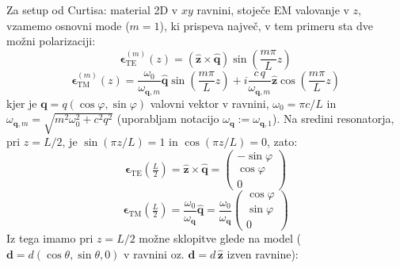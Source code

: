 \documentclass[a4paper,10pt]{article}
\renewcommand{\vec}[1]{\mathbf{#1}}
\begin{document}
Za setup od Curtisa: material 2D v $xy$ ravnini, stoječe EM valovanje v $z$, vzamemo osnovni mode ($m=1$), ki prispeva največ, v tem primeru sta dve možni polarizaciji:
\begin{equation}
\vec{\bm{\epsilon}}_{\text{TE}}^{(m)}(z) = \left( \hat{\mathbf{z}} \times \hat{\mathbf{q}} \right) \sin\left(\frac{m\pi}{L} z\right)
\end{equation}
\begin{equation}
\vec{\bm{\epsilon}}_{\text{TM}}^{(m)}(z) = \frac{\omega_0}{\omega_{\vec{q}, m}} \hat{\mathbf{q}} \sin\left(\frac{m\pi}{L} z\right) + i \frac{c\, q}{\omega_{\vec{q}, m}} \hat{\mathbf{z}} \cos\left(\frac{m\pi}{L} z\right)
\end{equation}
kjer je $\vec{q} = q(\cos\varphi, \sin\varphi)$ valovni vektor v ravnini, $\omega_0 = \pi c / L$ in $\omega_{\vec{q},m} = \sqrt{m^2\omega_0^2 + c^2 q^2}$ (uporabljam notacijo $\omega_\vec{q} := \omega_{\vec{q},1}$).
Na sredini resonatorja, pri $z = L/2$, je $\sin(\pi z / L) = 1$ in $\cos(\pi z / L) = 0$, zato:
\begin{equation}
\vec{\bm{\epsilon}}_{\text{TE}}\left(\tfrac{L}{2}\right) = \hat{\mathbf{z}} \times \hat{\mathbf{q}} = \begin{pmatrix} -\sin\varphi \\ \cos\varphi \\ 0 \end{pmatrix}
\end{equation}
\begin{equation}
\vec{\bm{\epsilon}}_{\text{TM}}\left(\tfrac{L}{2}\right) = \frac{\omega_0}{\omega_{\vec{q}}} \hat{\mathbf{q}} = \frac{\omega_0}{\omega_{\vec{q}}} \begin{pmatrix} \cos\varphi \\ \sin\varphi \\ 0 \end{pmatrix}
\end{equation}
Iz tega imamo pri $z = L/2$ možne sklopitve glede na model ($\vec{d} = d(\cos\theta, \sin\theta, 0)$ v ravnini oz. $\vec{d} = d\,\hat{\mathbf{z}}$ izven ravnine):
\end{document}
